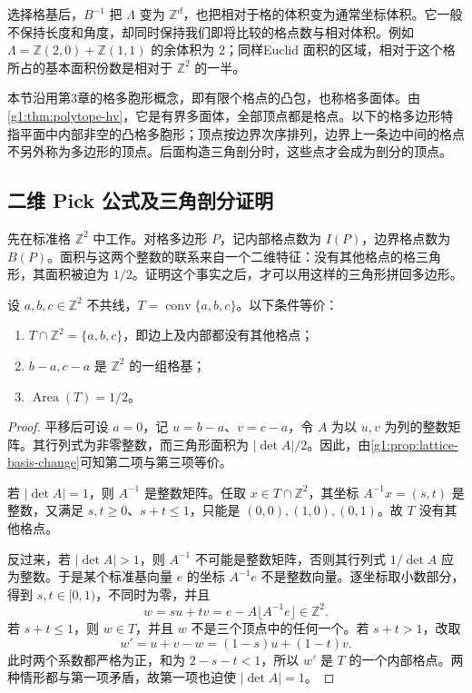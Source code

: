 选择格基后，\(B^{-1}\) 把 \(\Lambda\) 变为 \(\mathbb Z^d\)，也把相对于格的体积变为通常坐标体积。它一般不保持长度和角度，却同时保持我们即将比较的格点数与相对体积。例如 \(\Lambda=\mathbb Z(2,0)+\mathbb Z(1,1)\) 的余体积为 \(2\)；同样Euclid 面积的区域，相对于这个格所占的基本面积份数是相对于 \(\mathbb Z^2\) 的一半。

\ProseParagraphBreak

本节沿用第3章的格多胞形概念，即有限个格点的凸包，也称格多面体。由\cref{g1:thm:polytope-hv}，它是有界多面体，全部顶点都是格点。以下的格多边形特指平面中内部非空的凸格多胞形；顶点按边界次序排列，边界上一条边中间的格点不另外称为多边形的顶点。后面构造三角剖分时，这些点才会成为剖分的顶点。

\subsection{二维 Pick 公式及三角剖分证明}
\label{g1:subsec:B01:02}

先在标准格 \(\mathbb Z^2\) 中工作。对格多边形 \(P\)，记内部格点数为 \(I(P)\)，边界格点数为 \(B(P)\)。面积与这两个整数的联系来自一个二维特征：没有其他格点的格三角形，其面积被迫为 \(1/2\)。证明这个事实之后，才可以用这样的三角形拼回多边形。

\begin{lemma}
	\label{g1:lem:empty-lattice-triangle}
	设 \(a,b,c\in\mathbb Z^2\) 不共线，\(T=\operatorname{conv}\{a,b,c\}\)。以下条件等价：
	\begin{enumerate}
		\item \(T\cap\mathbb Z^2=\{a,b,c\}\)，即边上及内部都没有其他格点；
		\item \(b-a,c-a\) 是 \(\mathbb Z^2\) 的一组格基；
		\item \(\operatorname{Area}(T)=1/2\)。
	\end{enumerate}
\end{lemma}
\begin{proof}
	平移后可设 \(a=0\)，记 \(u=b-a\)、\(v=c-a\)，令 \(A\) 为以 \(u,v\) 为列的整数矩阵。其行列式为非零整数，而三角形面积为 \(|\det A|/2\)。因此，由\cref{g1:prop:lattice-basis-change}可知第二项与第三项等价。

	若 \(|\det A|=1\)，则 \(A^{-1}\) 是整数矩阵。任取 \(x\in T\cap\mathbb Z^2\)，其坐标 \(A^{-1}x=(s,t)\) 是整数，又满足 \(s,t\ge0\)、\(s+t\le1\)，只能是 \((0,0),(1,0),(0,1)\)。故 \(T\) 没有其他格点。

	反过来，若 \(|\det A|>1\)，则 \(A^{-1}\) 不可能是整数矩阵，否则其行列式 \(1/\det A\) 应为整数。于是某个标准基向量 \(e\) 的坐标 \(A^{-1}e\) 不是整数向量。逐坐标取小数部分，得到 \(s,t\in[0,1)\)，不同时为零，并且
	\[
		w=su+tv=e-A\lfloor A^{-1}e\rfloor\in\mathbb Z^2.
	\]
	若 \(s+t\le1\)，则 \(w\in T\)，并且 \(w\) 不是三个顶点中的任何一个。若 \(s+t>1\)，改取
	\[
		w'=u+v-w=(1-s)u+(1-t)v.
	\]
	此时两个系数都严格为正，和为 \(2-s-t<1\)，所以 \(w'\) 是 \(T\) 的一个内部格点。两种情形都与第一项矛盾，故第一项也迫使 \(|\det A|=1\)。
\end{proof}

